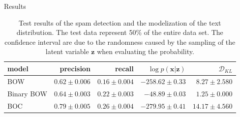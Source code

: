 \documentclass{beamer}
\newcommand{\kldiv}{\mathcal{D}_{KL}}
\begin{document}
\begin{frame}{Results}
\begin{table}[h]
	\caption{Test results of the spam detection and the modelization of the text distribution. The test data represent 50\% of the entire data set. The confidence interval are due to the randomness caused by the sampling of the latent variable $\mathbf{z}$ when evaluating the probability.}
	\centering
	\begin{adjustbox}{max width=\textwidth}
		\begin{tabular}{lrrrr}
			\toprule
			model & precision &  recall & $\log p(\mathbf{x}|\mathbf{z})$ & $\kldiv$\\
			\midrule
			BOW &  $0.62\pm 0.006$ &$0.16\pm 0.004$ & $-258.62\pm 0.33$ & $8.27\pm 2.580$\\
			Binary BOW & $0.64\pm 0.003$ & $0.22\pm 0.003$ & $-48.89\pm 0.03$ & $1.25\pm 0.000$\\
			BOC & $0.79\pm0.005$ & $0.26\pm 0.004$ & $-279.95\pm 0.41$ & $14.17\pm 4.560$ \\
			\bottomrule
		\end{tabular}
	\end{adjustbox}
	\label{table:result}
\end{table}
\end{frame}
\end{document}
